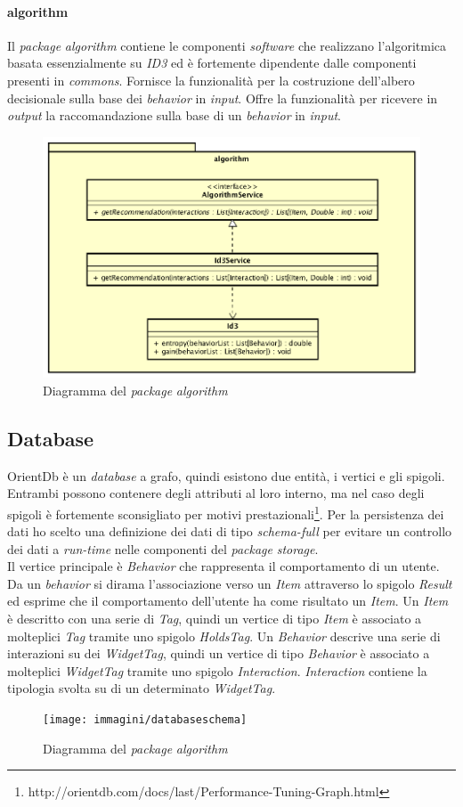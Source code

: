 \paragraph*{algorithm}
Il \emph{package} \emph{algorithm} contiene le componenti \emph{software} che realizzano l'algoritmica basata essenzialmente su \emph{ID3} ed è fortemente dipendente dalle componenti presenti in \emph{commons}. Fornisce la funzionalità per la costruzione dell'albero decisionale sulla base dei \emph{behavior} in \emph{input}. Offre la funzionalità per ricevere in \emph{output} la raccomandazione sulla base di un \emph{behavior} in \emph{input}.
\begin{figure}[h]
\centering
\includegraphics[scale=0.30]{immagini/algorithm}
\caption{Diagramma del \emph{package} \emph{algorithm}}
\label{fig:pack-algorithm}
\end{figure}
\subsection{Database}
OrientDb è un \emph{database} a grafo, quindi esistono due entità, i vertici e gli spigoli. Entrambi possono contenere degli attributi al loro interno, ma nel caso degli spigoli è fortemente sconsigliato per motivi prestazionali\footnote{http://orientdb.com/docs/last/Performance-Tuning-Graph.html}. Per la persistenza dei dati ho scelto una definizione dei dati di tipo \emph{schema-full} per evitare un controllo dei dati a \emph{run-time} nelle componenti del \emph{package} \emph{storage}.\\
Il vertice principale è \emph{Behavior} che rappresenta il comportamento di un utente. Da un \emph{behavior} si dirama l'associazione verso un \emph{Item} attraverso lo spigolo \emph{Result} ed esprime che il comportamento dell'utente ha come risultato un \emph{Item}. Un \emph{Item} è descritto con una serie di \emph{Tag}, quindi un vertice di tipo \emph{Item} è associato a molteplici \emph{Tag} tramite uno spigolo \emph{HoldsTag}. Un \emph{Behavior} descrive una serie di interazioni su dei \emph{WidgetTag}, quindi un vertice di tipo \emph{Behavior} è associato a molteplici \emph{WidgetTag} tramite uno spigolo \emph{Interaction}. \emph{Interaction} contiene la tipologia svolta su di un determinato \emph{WidgetTag}.
\begin{figure}[h]
\centering
\texttt{[image: immagini/databaseschema]}
\caption{Diagramma del \emph{package} \emph{algorithm}}
\label{fig:pack-algorithm}
\end{figure}
